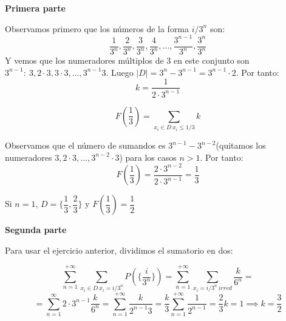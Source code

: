 \documentclass[openany]{book}
\begin{document}
\begin{exercise}
    $  $\\
    \begin{flushright}
        \textbf{Primera parte}
    \end{flushright}
    Observamos primero que los números de la forma $ i/3^{n} $ son:
    $$ \dfrac{1}{3^{n}}, \dfrac{2}{3^{n}},\dfrac{3}{3^{n}},\dfrac{4}{3^{n}},...,\dfrac{3^{n-1}}{3^{n}},\dfrac{3^{n}}{3^{n}} $$
    Y vemos que los numeradores múltiplos de 3 en este conjunto son $ 3^{n-1}:\ 3,2\cdot 3,3\cdot 3,...,3^{n-1}3 $. Luego $ |D|=3^{n}-3^{n-1} = 3^{n-1}\cdot 2 $. Por tanto:
    $$ k = \dfrac{1}{2\cdot 3^{n-1}} $$

    $$ F(\dfrac{1}{3}) = \sum\limits_{x_i \in D\ x_i \leq 1/3}^{} k $$

    Observamos que el número de sumandos es $ 3^{n-1}-3^{n-2} $(quitamos los numeradores $ 3,2\cdot 3,...,3^{n-2}\cdot 3 $)  para los casos $ n > 1 $. Por tanto:
    $$ F(\dfrac{1}{3}) = \dfrac{2 \cdot 3^{n-2}}{2 \cdot 3^{n-1}} = \dfrac{1}{3} $$

    Si $ n = 1 $, $ D = \{\dfrac{1}{3},\dfrac{2}{3}\} $ y $ F(\dfrac{1}{3}) = \dfrac{1}{2} $

    \begin{flushright}
        \textbf{Segunda parte}
    \end{flushright}

    Para usar el ejercicio anterior, dividimos el sumatorio en dos:

    $$ \sum\limits_{n=1}^{+\infty} \sum\limits_{x_i \in D\ x_i = i/3^{n}}^{} P(\{\dfrac{i}{3^{n}}\}) = \sum\limits_{n=1}^{+\infty} \sum\limits_{x_i = i/3^{n}\ irred}^{} \dfrac{k}{6^{n}} =$$
    $$= \sum\limits_{n=1}^{\infty} 2\cdot 3^{n-1} \dfrac{k}{6^{n}} = \sum\limits_{n=1}^{+\infty} \dfrac{k}{2^{n-1}3} = \dfrac{k}{3} \sum\limits_{n=1}^{+\infty} \dfrac{1}{2^{n-1}} = \dfrac{2}{3}k = 1 \implies k=\dfrac{3}{2}$$

\end{exercise}
\end{document}
